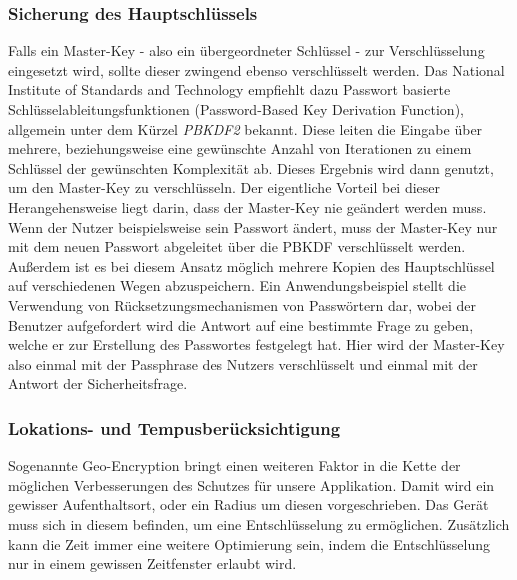		\subsubsection{Sicherung des Hauptschlüssels}\label{sec:master-key}		
			Falls ein Master-Key - also ein übergeordneter Schlüssel - zur
			Verschlüsselung eingesetzt wird, sollte dieser zwingend ebenso verschlüsselt
			werden. Das National Institute of Standards and Technology
			empfiehlt \cite{NISTPBKDF2010} dazu Passwort basierte 
			Schlüsselableitungsfunktionen (Password-Based Key Derivation Function),
			allgemein unter dem Kürzel \textsl{PBKDF2} bekannt.
			Diese leiten die Eingabe über mehrere, beziehungsweise eine gewünschte Anzahl
			von Iterationen zu einem Schlüssel der gewünschten Komplexität ab. Dieses
			Ergebnis wird dann genutzt, um den Master-Key zu verschlüsseln. Der
			eigentliche Vorteil bei dieser Herangehensweise liegt darin, dass der
			Master-Key nie geändert werden muss. Wenn der Nutzer beispielsweise sein
			Passwort ändert, muss der Master-Key nur mit dem neuen Passwort abgeleitet
			über die PBKDF verschlüsselt werden. Außerdem ist es bei diesem Ansatz
			möglich mehrere Kopien des Hauptschlüssel auf verschiedenen Wegen
			abzuspeichern. Ein Anwendungsbeispiel stellt die
			Verwendung von Rücksetzungsmechanismen von Passwörtern dar, wobei der
			Benutzer aufgefordert wird die Antwort auf eine bestimmte Frage zu geben,
			welche er zur Erstellung des Passwortes festgelegt hat. Hier wird der
			Master-Key also einmal mit der Passphrase des Nutzers verschlüsselt und
			einmal mit der Antwort der Sicherheitsfrage.
		\subsubsection{Lokations- und Tempusberücksichtigung}
			Sogenannte Geo-Encryption bringt einen weiteren Faktor in die Kette der
			möglichen Verbesserungen des Schutzes für unsere Applikation. Damit wird
			ein gewisser Aufenthaltsort, oder ein Radius um diesen vorgeschrieben. Das
			Gerät muss sich in diesem befinden, um eine Entschlüsselung zu ermöglichen.
			Zusätzlich kann die Zeit immer eine weitere Optimierung sein, indem die
			Entschlüsselung nur in einem gewissen Zeitfenster erlaubt wird.
